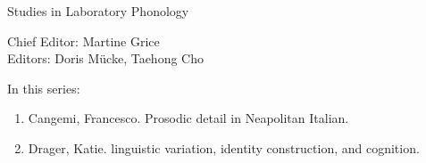 
{\raggedleft{}}

\bigskip

{\large Studies in Laboratory Phonology}

\bigskip

Chief Editor:  Martine Grice%
\\
Editors:    Doris Mücke, %
    Taehong Cho %

\bigskip

In this series:

\begin{enumerate}
\item Cangemi, Francesco. Prosodic detail in Neapolitan Italian.
\item Drager, Katie. linguistic variation, identity construction, and cognition.
\end{enumerate}






